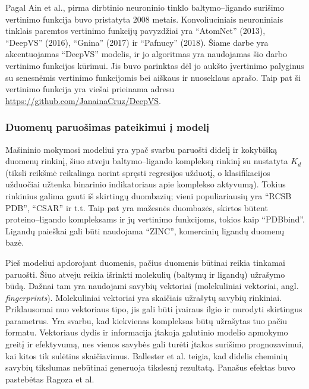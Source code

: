 Pagal Ain et al.,\cite{ain_machine-learning_2015} pirma dirbtinio neuroninio tinklo baltymo--ligando surišimo vertinimo funkcija buvo pristatyta 2008 metais. Konvoliuciniais neuroniniais tinklais paremtos vertinimo funkcijų pavyzdžiai yra \enquote{AtomNet} (2013)\cite{wallach_atomnet_2015}, \enquote{DeepVS} (2016)\cite{pereira_boosting_2016}, \enquote{Gnina} (2017)\cite{ragoza_proteinligand_2017} ir \enquote{Pafnucy} (2018)\cite{stepniewska-dziubinska_development_2018}. Šiame darbe yra akcentuojamas \enquote{DeepVS} modelis, ir jo algoritmas yra naudojamas šio darbo vertinimo funkcijos kūrimui. Jis buvo parinktas dėl jo aukšto įvertinimo palyginus su senesnėmis vertinimo funkcijomis bei aiškaus ir nuoseklaus aprašo. Taip pat ši vertinimo funkcija yra viešai prieinama adresu \url{https://github.com/JanainaCruz/DeepVS}. 

\subsubsection{Duomenų paruošimas pateikimui į modelį}

Mašininio mokymosi modeliui yra ypač svarbu paruošti didelį ir kokybišką duomenų rinkinį, šiuo atveju baltymo--ligando kompleksų rinkinį su nustatyta $K_{d}$ (tiksli reikšmė reikalinga norint spręsti regresijos užduotį, o klasifikacijos užduočiai užtenka binarinio indikatoriaus apie komplekso aktyvumą). Tokius rinkinius galima gauti iš skirtingų duombazių; vieni populiariausių yra \enquote{RCSB PDB}, \enquote{CSAR} ir t.t.\cite{ragoza_proteinligand_2017} Taip pat yra mažesnės duombazės, skirtos būtent proteino--ligando kompleksams ir jų vertinimo funkcijoms, tokios kaip \enquote{PDBbind}. Ligandų paieškai gali būti naudojama \enquote{ZINC}, komercinių ligandų duomenų bazė. 

Pieš modeliui apdorojant duomenis, pačius duomenis būtinai reikia tinkamai paruošti. Šiuo atveju reikia išrinkti molekulių (baltymų ir ligandų) užrašymo būdą. Dažnai tam yra naudojami savybių vektoriai (molekuliniai vektoriai, angl. \textit{fingerprints}).\cite{ballester_does_2014} Molekuliniai vektoriai yra skaičiais užrašytų savybių rinkiniai. Priklausomai nuo vektoriaus tipo, jis gali būti įvairaus ilgio ir nurodyti skirtingus parametrus. Yra svarbu, kad kiekvienas kompleksas būtų užrašytas tuo pačiu formatu. Vektoriaus dydis ir informacija įtakoja galutinio modelio apmokymo greitį ir efektyvumą, nes vienos savybės gali turėti įtakos surišimo prognozavimui, kai kitos tik sulėtins skaičiavimus. Ballester et al.\cite{ballester_does_2014} teigia, kad didelis cheminių savybių tikslumas nebūtinai generuoja tikslesnį rezultatą. Panašus efektas buvo pastebėtas Ragoza et al.\cite{ragoza_proteinligand_2017}

